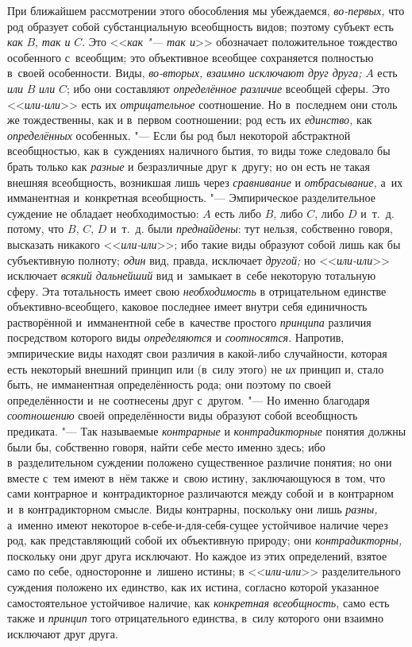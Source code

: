 При ближайшем рассмотрении этого обособления мы убеждаемся,
{\em во-первых,} что род
образует собой субстанциальную всеобщность видов; поэтому субъект есть
{\em как} $B$, {\em так и} $C$. Это <<{\em как "--- так и}>>
обозначает положительное тождество особенного с~всеобщим; это
объективное всеобщее сохраняется полностью в~своей особенности. Виды,
{\em во-вторых, взаимно исключают друг друга;} $A$ есть
{\em или} $B$ {\em или} $C$; ибо они составляют {\em определённое
различие} всеобщей сферы. Это <<{\em или-или}>> есть их {\em отрицательное}
соотношение. Но в~последнем они столь же тождественны, как и
в~первом соотношении; род есть их {\em единство,} как {\em определённых}
особенных. "--- Если бы род был некоторой
абстрактной всеобщностью, как в~суждениях наличного бытия, то виды тоже
следовало бы брать только как {\em разные} и
безразличные друг к~другу; но он есть не такая внешняя всеобщность,
возникшая лишь через {\em сравнивание} и {\em отбрасывание,}
а~их имманентная и~конкретная всеобщность. "---
Эмпирическое разделительное суждение не обладает
необходимостью: $A$ есть либо $B$, либо $C$, либо $D$ и~т.~д.
потому, что $B$, $C$, $D$ и~т.~д. были {\em преднайдены}: тут
нельзя, собственно говоря, высказать никакого <<{\em или-или}>>; ибо
такие виды образуют собой лишь как бы субъективную полноту;
{\em один} вид, правда, исключает {\em другой;} но <<{\em или-или}>>
исключает {\em всякий дальнейший} вид и~замыкает в~себе некоторую
тотальную сферу. Эта тотальность имеет свою {\em необходимость} в
отрицательном единстве объективно-всеобщего, каковое последнее имеет внутри
себя единичность растворённой и~имманентной себе в~качестве простого
{\em принципа} различия посредством которого виды {\em определяются} и
{\em соотносятся}. Напротив, эмпирические виды находят свои различия в
какой-либо случайности, которая есть некоторый внешний принцип или (в~силу
этого) не {\em их} принцип и, стало быть, не имманентная определённость рода;
они поэтому по своей определённости и~не соотнесены друг с~другом. "---
Но именно благодаря {\em соотношению} своей
определённости виды образуют собой всеобщность предиката. "--- Так называемые
{\em контрарные} и {\em контрадикторные}
понятия должны были бы, собственно говоря, найти себе место
именно здесь; ибо в~разделительном суждении положено существенное различие
понятия; но они вместе с~тем имеют в~нём также и~свою истину, заключающуюся
в~том, что сами контрарное и~контрадикторное различаются между собой и~в
контрарном и~в контрадикторном смысле. Виды контрарны, поскольку они лишь
{\em разны,} а~именно
имеют некоторое в-себе-и-для-себя-сущее устойчивое наличие через род, как
представляющий собой их объективную природу; они {\em контрадикторны,}
поскольку они друг друга исключают. Но каждое из этих
определений, взятое само по себе, односторонне и~лишено истины; в
<<{\em или-или}>>
разделительного суждения положено их единство, как их истина,
согласно которой указанное самостоятельное устойчивое наличие, как
{\em конкретная всеобщность,} само есть также и {\em принцип} того
отрицательного единства, в~силу которого они взаимно исключают друг друга.

